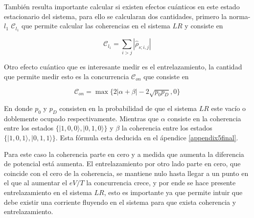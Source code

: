  También resulta importante calcular si existen efectos cuánticos en este estado estacionario del sistema, para ello se calcularan dos cantidades, primero la norma-$l_{1}$ $\mathcal{C}_{l_{1}}$ que permite calcular las coherencias en el sistema $LR$ y consiste en 

\begin{equation*}
    \mathcal{C}_{l_{1}} = \sum_{i> j} |\hat{\rho}_{s;i,j}|
\end{equation*}

Otro efecto cuántico que es interesante medir es el entrelazamiento, la cantidad que permite medir esto es la concurrencia $\mathcal{C}_{on}$ \cite{hill1997entanglement,wootters1998entanglement} que consiste en 

\begin{equation*}
    \mathcal{C}_{on} = \max \{ 2|\alpha+\beta| - 2\sqrt{p_{0}p_{D}},0 \}
\end{equation*}

En donde $p_{0}$ y $p_{D}$ consisten en la probabilidad de que el sistema $LR$ este vacío o doblemente ocupado respectivamente. Mientras que $\alpha$ consiste en la coherencia entre los estados $\{|1,0,0\rangle, |0,1,0\rangle \}$ y $\beta$ la coherencia entre los estados  $\{|1,0,1\rangle, |0,1,1\rangle\}$. Esta fórmula esta deducida en el ápendice \ref{appendix5final}. 

    
Para este caso la coherencia parte en cero y a medida que aumenta la diferencia de potencial está aumenta. El entrelazamiento por otro lado parte en cero, que coincide con el cero de la coherencia, se mantiene nulo hasta llegar a un punto en el que al aumentar el $eV/T$ la concurrencia crece, y por ende se hace presente entrelazamiento en el sistema $LR$, esto es importante ya que permite intuir que debe existir una corriente fluyendo en el sistema para que exista coherencia y entrelazamiento.

\label{sec5:transporte}

\newpage

